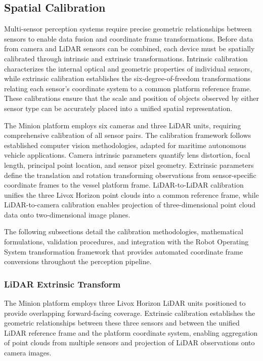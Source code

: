 \subsection{Spatial Calibration} \label{spatial_calibration}

Multi-sensor perception systems require precise geometric relationships between sensors to enable data fusion and coordinate frame transformations.
Before data from camera and LiDAR sensors can be combined, each device must be spatially calibrated through intrinsic and extrinsic transformations.
Intrinsic calibration characterizes the internal optical and geometric properties of individual sensors, while extrinsic calibration establishes the six-degree-of-freedom transformations relating each sensor's coordinate system to a common platform reference frame.
These calibrations ensure that the scale and position of objects observed by either sensor type can be accurately placed into a unified spatial representation.

The Minion platform employs six cameras and three LiDAR units, requiring comprehensive calibration of all sensor pairs.
The calibration framework follows established computer vision methodologies, adapted for maritime autonomous vehicle applications.
Camera intrinsic parameters quantify lens distortion, focal length, principal point location, and sensor pixel geometry.
Extrinsic parameters define the translation and rotation transforming observations from sensor-specific coordinate frames to the vessel platform frame.
LiDAR-to-LiDAR calibration unifies the three Livox Horizon point clouds into a common reference frame, while LiDAR-to-camera calibration enables projection of three-dimensional point cloud data onto two-dimensional image planes.

The following subsections detail the calibration methodologies, mathematical formulations, validation procedures, and integration with the Robot Operating System transformation framework that provides automated coordinate frame conversions throughout the perception pipeline.

\subsubsection{LiDAR Extrinsic Transform} \label{lidar_extrinsic}


The Minion platform employs three Livox Horizon LiDAR units positioned to provide overlapping forward-facing coverage.
Extrinsic calibration establishes the geometric relationships between these three sensors and between the unified LiDAR reference frame and the platform coordinate system, enabling aggregation of point clouds from multiple sensors and projection of LiDAR observations onto camera images.

